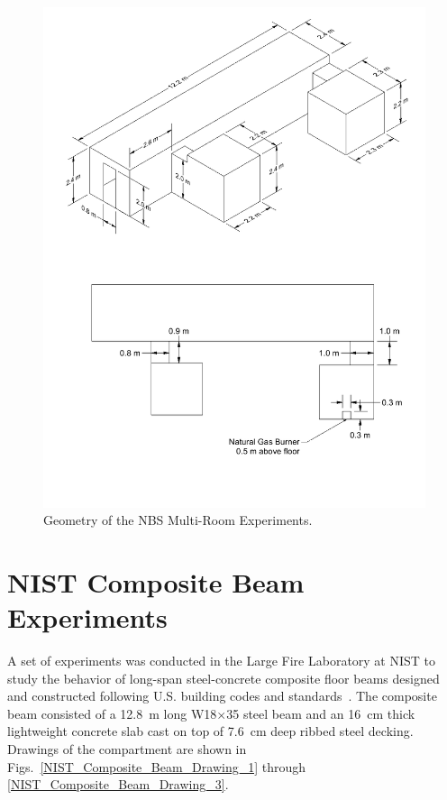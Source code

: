 \begin{figure}[p]
\includegraphics[width=\textwidth]{FIGURES/NBS/NBS}
\caption[Geometry of the NBS Multi-Room Experiments]{Geometry of the NBS Multi-Room Experiments.}
\label{NBS_Drawing}
\end{figure}


\section{NIST Composite Beam Experiments}
\label{NIST_Composite_Beam_Description}

A set of experiments was conducted in the Large Fire Laboratory at NIST to study the behavior of long-span steel-concrete composite floor beams designed and constructed following U.S. building codes and standards~\cite{Ramesh:TNXXXX}. The composite beam consisted of a 12.8~m long W18$\times$35 steel beam and an 16~cm thick lightweight concrete slab cast on top of 7.6~cm deep ribbed steel decking. Drawings of the compartment are shown in Figs.~\ref{NIST_Composite_Beam_Drawing_1} through \ref{NIST_Composite_Beam_Drawing_3}.

